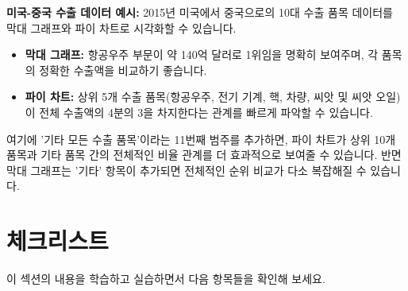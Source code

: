 \documentclass[11pt,a4paper]{article}
\begin{document}
\begin{examplebox}
\textbf{미국-중국 수출 데이터 예시:}
2015년 미국에서 중국으로의 10대 수출 품목 데이터를 막대 그래프와 파이 차트로 시각화할 수 있습니다.
\begin{itemize}
    \item \textbf{막대 그래프:} 항공우주 부문이 약 140억 달러로 1위임을 명확히 보여주며, 각 품목의 정확한 수출액을 비교하기 좋습니다.
    \item \textbf{파이 차트:} 상위 5개 수출 품목(항공우주, 전기 기계, 핵, 차량, 씨앗 및 씨앗 오일)이 전체 수출액의 4분의 3을 차지한다는 관계를 빠르게 파악할 수 있습니다.
\end{itemize}
여기에 '기타 모든 수출 품목'이라는 11번째 범주를 추가하면, 파이 차트가 상위 10개 품목과 기타 품목 간의 전체적인 비율 관계를 더 효과적으로 보여줄 수 있습니다. 반면 막대 그래프는 '기타' 항목이 추가되면 전체적인 순위 비교가 다소 복잡해질 수 있습니다.
\end{examplebox}

\newpage
\section*{체크리스트}

이 섹션의 내용을 학습하고 실습하면서 다음 항목들을 확인해 보세요.
\end{document}
